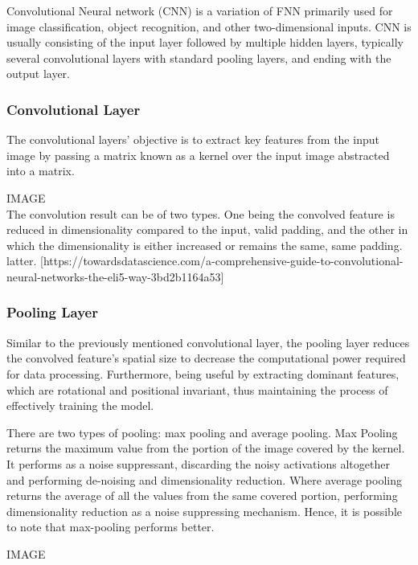 
Convolutional Neural network (CNN) is a variation of FNN primarily used for image classification,
 object recognition, and other two-dimensional inputs.\cite{Goodfellow-et-al-2016} CNN is usually consisting of the input layer followed by multiple hidden layers, typically several convolutional layers with standard pooling layers, and ending with the output layer.

\subsubsection{Convolutional Layer}

The convolutional layers' objective is to extract key features from the input image by passing
 a matrix known as a kernel over the input image abstracted into a matrix.\cite{mathworkscnn}

IMAGE \\

The convolution result can be of two types. One being the convolved feature is reduced in dimensionality compared to the input, valid padding, and the other in which the dimensionality is either increased or remains the same, same padding. latter. [https://towardsdatascience.com/a-comprehensive-guide-to-convolutional-neural-networks-the-eli5-way-3bd2b1164a53]

\subsubsection{Pooling Layer}


Similar to the previously mentioned convolutional layer, the pooling layer reduces the convolved
 feature's spatial size to decrease the computational power required for data processing.
Furthermore, being useful by extracting dominant features, which are rotational and positional invariant,
 thus maintaining the process of effectively training the model.\cite{compguideCnn}

There are two types of pooling: max pooling and average pooling.
 Max Pooling returns the maximum value from the portion of the image covered by the kernel.
 It performs as a noise suppressant, discarding the noisy activations altogether and
  performing de-noising and dimensionality reduction. Where average pooling returns the
   average of all the values from the same covered portion, performing dimensionality reduction as a noise suppressing mechanism.
    Hence, it is possible to note that max-pooling performs better.\cite{compguideCnn}

IMAGE
